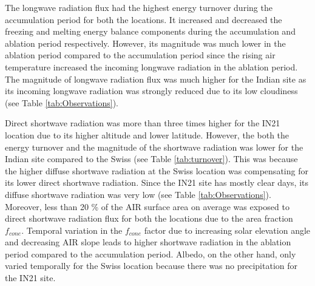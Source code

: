 \documentclass[utf8]{frontiersSCNS}
\begin{document}
The longwave radiation flux had the highest energy turnover during the accumulation period for both the
locations. It increased and decreased the freezing and melting energy balance components during the accumulation
and ablation period respectively. However, its magnitude was much lower in the ablation period compared to the
accumulation period since the rising air temperature increased the incoming longwave radiation in the ablation
period. The magnitude of longwave radiation flux was much higher for the Indian site as its incoming longwave
radiation was strongly reduced due to its low cloudiness (see Table \ref{tab:Observations}).

Direct shortwave radiation was more than three times higher for the IN21 location due to its higher altitude and
lower latitude. However, the both the energy turnover and the magnitude of the shortwave radiation was lower for
the Indian site compared to the Swiss (see Table \ref{tab:turnover}). This was because the higher diffuse
shortwave radiation at the Swiss location was compensating for its lower direct shortwave radiation. Since the
IN21 site has mostly clear days, its diffuse shortwave radiation was very low (see Table
\ref{tab:Observations}). Moreover, less than 20 \% of the AIR surface area on average was exposed to direct
shortwave radiation flux for both the locations due to the area fraction $f_{cone}$. Temporal variation in the
$f_{cone}$ factor due to increasing solar elevation angle and decreasing AIR slope leads to higher shortwave
radiation in the ablation period compared to the accumulation period. Albedo, on the other hand, only varied
temporally for the Swiss location because there was no precipitation for the IN21 site.
\end{document}
